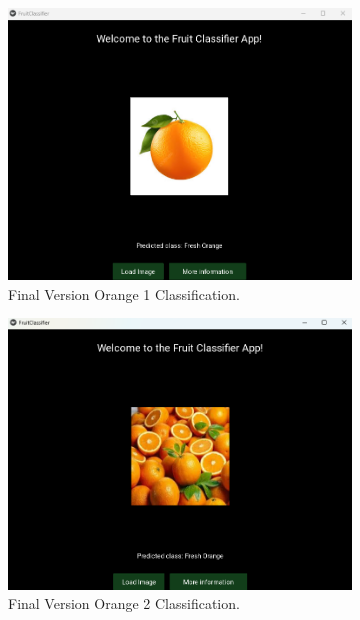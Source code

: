 \documentclass[conference]{IEEEtran}
\begin{document}
\begin{figure}[h]
\begin{subfigure}[b]{0.48\linewidth}
        \includegraphics[width=\linewidth]{Mlayer orage1.png}
        \caption{Final Version Orange 1 Classification.}
        \label{figFA}
    \end{subfigure}
    \hfill
    \begin{subfigure}[b]{0.48\linewidth}
        \centering
        \includegraphics[width=\linewidth]{Mlayer orage2.png}
        \caption{Final Version Orange 2 Classification.}
        \label{figFB}
    \end{subfigure}
    \hfill
    \begin{subfigure}[b]{0.48\linewidth}
        \centering

\end{subfigure}
\end{figure}
\end{document}
